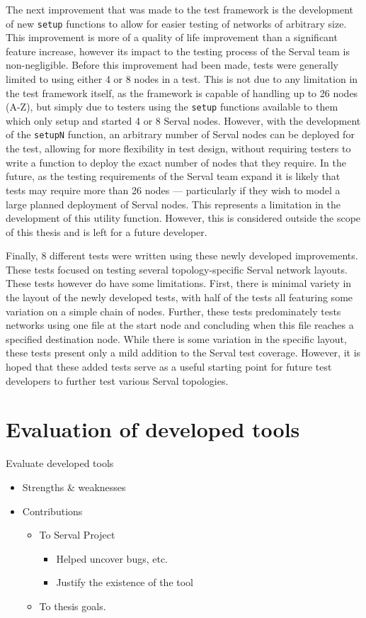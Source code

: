 The next improvement that was made to the test framework is the development of new \texttt{setup} functions to allow for easier testing of networks of arbitrary size.
This improvement is more of a quality of life improvement than a significant feature increase, however its impact to the testing process of the Serval team is non-negligible.
Before this improvement had been made, tests were generally limited to using either 4 or 8 nodes in a test. 
This is not due to any limitation in the test framework itself, as the framework is capable of handling up to 26 nodes (A-Z), but simply due to testers using the \texttt{setup} functions available to them which only setup and started 4 or 8 Serval nodes.
However, with the development of the \texttt{setupN} function, an arbitrary number of Serval nodes can be deployed for the test, allowing for more flexibility in test design, without requiring testers to write a function to deploy the exact number of nodes that they require.
In the future, as the testing requirements of the Serval team expand it is likely that tests may require more than 26 nodes — particularly if they wish to model a large planned deployment of Serval nodes.
This represents a limitation in the development of this utility function.
However, this is considered outside the scope of this thesis and is left for a future developer.

Finally, 8 different tests were written using these newly developed improvements.
These tests focused on testing several topology-specific Serval network layouts.
These tests however do have some limitations. First, there is minimal variety in the layout of the newly developed tests, with half of the tests all featuring some variation on a simple chain of nodes.
Further, these tests predominately tests networks using one file at the start node and concluding when this file reaches a specified destination node.
While there is some variation in the specific layout, these tests present only a mild addition to the Serval test coverage.
However, it is hoped that these added tests serve as a useful starting point for future test developers to further test various Serval topologies.



\section{Evaluation of developed tools}
Evaluate developed tools
\begin{itemize}
    \item Strengths \& weaknesses
    \item Contributions
    \begin{itemize}
        \item To Serval Project
        \begin{itemize}
            \item Helped uncover bugs, etc.
            \item Justify the existence of the tool
        \end{itemize}
        \item To thesis goals.
    \end{itemize}
\end{itemize}


